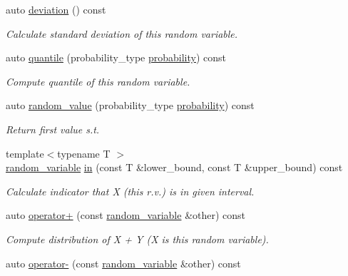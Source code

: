 \begin{DoxyCompactItemize}
auto \mbox{\hyperlink{classdice_1_1random__variable_ae72311eea3b8ad6c66893c2af3489d74}{deviation}} () const
\begin{DoxyCompactList}\small\item\em Calculate standard deviation of this random variable. \end{DoxyCompactList}\item 
auto \mbox{\hyperlink{classdice_1_1random__variable_aa1c5beebc469a8cc51906fd0b48ef5b1}{quantile}} (probability\+\_\+type \mbox{\hyperlink{classdice_1_1random__variable_a0759c25151ebb5618e2ff0ecbb91c80d}{probability}}) const
\begin{DoxyCompactList}\small\item\em Compute quantile of this random variable. \end{DoxyCompactList}\item 
auto \mbox{\hyperlink{classdice_1_1random__variable_a559e5f26fcd39e1f68b22681aab90664}{random\+\_\+value}} (probability\+\_\+type \mbox{\hyperlink{classdice_1_1random__variable_a0759c25151ebb5618e2ff0ecbb91c80d}{probability}}) const
\begin{DoxyCompactList}\small\item\em Return first value s.\+t. \end{DoxyCompactList}\item 
{\footnotesize template$<$typename T $>$ }\\\mbox{\hyperlink{classdice_1_1random__variable}{random\+\_\+variable}} \mbox{\hyperlink{classdice_1_1random__variable_a20c851091e966593c053252fb76f390e}{in}} (const T \&lower\+\_\+bound, const T \&upper\+\_\+bound) const
\begin{DoxyCompactList}\small\item\em Calculate indicator that X (this r.\+v.) is in given interval. \end{DoxyCompactList}\item 
auto \mbox{\hyperlink{classdice_1_1random__variable_a125e2b252af1eb4edd04011f81f080cf}{operator+}} (const \mbox{\hyperlink{classdice_1_1random__variable}{random\+\_\+variable}} \&other) const
\begin{DoxyCompactList}\small\item\em Compute distribution of X + Y (X is this random variable). \end{DoxyCompactList}\item 
auto \mbox{\hyperlink{classdice_1_1random__variable_a40ad720c40cb4467dbb2b735512b279c}{operator-\/}} (const \mbox{\hyperlink{classdice_1_1random__variable}{random\+\_\+variable}} \&other) const

\end{DoxyCompactItemize}
